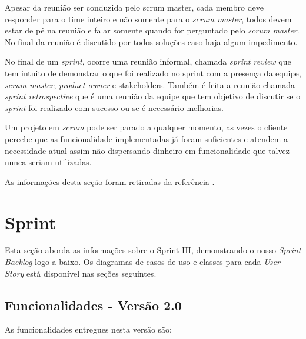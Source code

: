 \documentclass{abnt}
\begin{document}
			Apesar da reunião ser conduzida pelo scrum master, cada membro deve responder para o time inteiro e não somente para o
			\emph{scrum master}, todos devem estar de pé na reunião e falar somente quando for perguntado pelo \emph{scrum master}. No final da
			reunião é discutido por todos soluções caso haja algum impedimento.
			
			No final de um \emph{sprint}, ocorre uma reunião informal, chamada \emph{sprint review} que tem intuito de demonstrar o que foi 
			realizado no sprint com a presença da equipe, \emph{scrum master}, \emph{product owner} e stakeholders. Também é feita a reunião chamada \emph{sprint retrospective}
			que é uma reunião da equipe que tem objetivo de discutir se o \emph{sprint} foi realizado com sucesso ou se é necessário melhorias.
			
			Um projeto em \emph{scrum} pode ser parado a qualquer momento, as vezes o cliente percebe que as funcionalidade implementadas já foram
			suficientes e atendem a necessidade atual assim não dispersando dinheiro em funcionalidade que talvez nunca seriam utilizadas.
			
			As informações desta seção foram retiradas da referência \cite{SCRUMEPF}.
	
		
		

\clearpage

\chapter{Sprint}
	
		Esta seção aborda as informações sobre o Sprint III, demonstrando o nosso \emph{Sprint Backlog} logo a baixo. Os diagramas de casos de uso e classes para cada \emph{User Story} está disponível nas seções seguintes.
	
			
		\section{Funcionalidades - Versão 2.0}
		
			As funcionalidades entregues nesta versão são:
		
\end{document}
